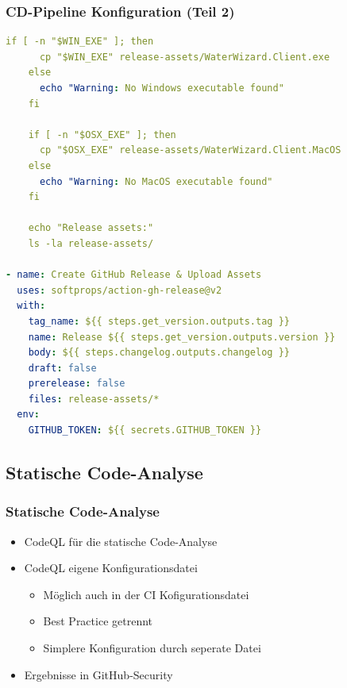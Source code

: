 \documentclass{beamer}
\begin{document}
\begin{frame}[fragile]
\frametitle{CD-Pipeline Konfiguration (Teil 2)}
  \begin{lstlisting}[language=yaml, basicstyle=\ttfamily\tiny, breaklines=true]
    if [ -n "$WIN_EXE" ]; then
      cp "$WIN_EXE" release-assets/WaterWizard.Client.exe
    else
      echo "Warning: No Windows executable found"
    fi

    if [ -n "$OSX_EXE" ]; then
      cp "$OSX_EXE" release-assets/WaterWizard.Client.MacOS
    else
      echo "Warning: No MacOS executable found"
    fi

    echo "Release assets:"
    ls -la release-assets/

- name: Create GitHub Release & Upload Assets
  uses: softprops/action-gh-release@v2
  with:
    tag_name: ${{ steps.get_version.outputs.tag }}
    name: Release ${{ steps.get_version.outputs.version }}
    body: ${{ steps.changelog.outputs.changelog }}
    draft: false
    prerelease: false
    files: release-assets/*
  env:
    GITHUB_TOKEN: ${{ secrets.GITHUB_TOKEN }} 
  \end{lstlisting}
\end{frame}

\subsection{Statische Code-Analyse}
\begin{frame}
\frametitle{Statische Code-Analyse}
  \begin{itemize}
    \item CodeQL für die statische Code-Analyse
    \item CodeQL eigene Konfigurationsdatei
      \begin{itemize} 
        \item Möglich auch in der CI Kofigurationsdatei
        \item Best Practice getrennt
        \item Simplere Konfiguration durch seperate Datei
      \end{itemize} 
    \item Ergebnisse in GitHub-Security
  \end{itemize}
\end{frame}
\end{document}
